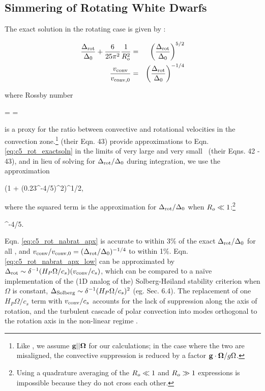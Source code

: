 \subsection{Simmering of Rotating White Dwarfs}
\label{ssec:c5_runaway_rot}

The exact solution in the rotating case is given by \citeal{stev79}:

\begin{eqnarray}
\frac{\dnabrot}{\dnabconvzero} + \frac{6}{25\pi^2}\frac{1}{\rossby^2} &=& \left(\frac{\dnabrot}{\dnabconvzero}\right)^{5/2} \nonumber \\
\frac{\vconv}{\vconvzero} &=& \left(\frac{\dnabrot}{\dnabconvzero}\right)^{-1/4}
\label{eq:c5_rot_exactsoln}
\end{eqnarray}

\noindent where Rossby number

\eqbegin
\rossby =  = 
\label{eq:c5_rossbynumber}
\eqend

\noindent is a proxy for the ratio between convective and rotational velocities in the convection zone.\footnote{Like \cite{barkdl14}, we assume ${\bf g}||\boldsymbol{\Omega}$ for our calculations; in the case where the two are misaligned, the convective suppression is reduced by a factor ${\bf g}\cdot \boldsymbol{\Omega}/g\Omega$.}  \citeal{stev79} (their Eqn. 43) provide approximations to Eqn. \ref{eq:c5_rot_exactsoln} in the limits of very large and very small \rossby\ (their Eqns. 42 - 43), and in lieu of solving for $\dnabrot/\dnabconvzero$ during integration, we use the approximation

\eqbegin
\frac{\dnabrot}{\dnabconvzero} \approx \left(1 + \left(0.23\rossby^{-4/5}\right)^2\right)^{1/2},
\label{eq:c5_rot_nabrat_apx}
\eqend

\noindent where the squared term is the \citeal{stev79} approximation for $\dnabrot/\dnabconvzero$ when $\rossby \ll 1$:\footnote{Using a quadrature averaging of the \citeal{stev79} $\rossby \ll 1$ and $\rossby \gg 1$ expressions is impossible because they do not cross each other.}

\eqbegin
\frac{\dnabrot}{\dnabconvzero}  \rossby^{-4/5}.
\label{eq:c5_rot_nabrat_apx_low}
\eqend

\noindent Eqn. \ref{eq:c5_rot_nabrat_apx} is accurate to within 3\% of the exact $\dnabrot/\dnabconvzero$ for all \rossby, and $\vconv/\vconvzero = (\dnabrot/\dnabconvzero)^{-1/4}$ to within 1\%.  Eqn. \ref{eq:c5_rot_nabrat_apx_low} can be approximated by $\dnabrot \sim \delta^{-1}(H_P\Omega/c_s)(\vconv/c_s)$, which can be compared to a na\"{i}ve implementation of the (1D analog of the) Solberg-H{\o}iland stability criterion {\charles when $\Omega$ is constant, $\Delta_\mathrm{Solberg} \sim \delta^{-1}(H_P\Omega/c_s)^2$ (eg. \citealt{maed09} Sec. 6.4).}  The replacement of one $H_P\Omega/c_s$ term with $\vconv/c_s$ accounts for the lack of suppression along the axis of rotation, and the turbulent cascade of polar convection into modes orthogonal to the rotation axis in the non-linear regime \citep{barkdl14}.

